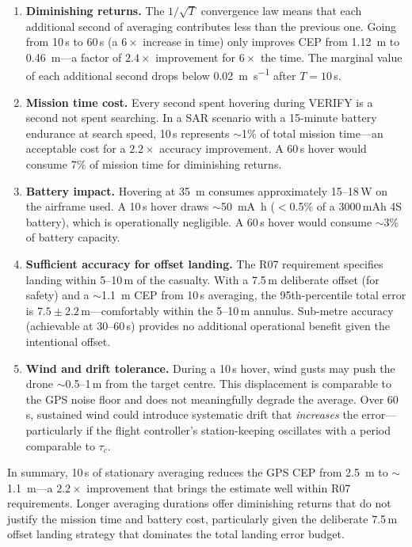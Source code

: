 \begin{enumerate}
  \item \textbf{Diminishing returns.}  The $1/\sqrt{T}$ convergence law means that each additional second of averaging contributes less than the previous one.  Going from 10\,s to 60\,s (a $6\times$ increase in time) only improves CEP from \SI{1.12}{\metre} to \SI{0.46}{\metre}---a factor of $2.4\times$ improvement for $6\times$ the time.  The marginal value of each additional second drops below \SI{0.02}{\metre\per\second} after $T = 10$\,s.

  \item \textbf{Mission time cost.}  Every second spent hovering during VERIFY is a second not spent searching.  In a SAR scenario with a 15-minute battery endurance at search speed, 10\,s represents $\sim$1\% of total mission time---an acceptable cost for a $2.2\times$ accuracy improvement.  A 60\,s hover would consume 7\% of mission time for diminishing returns.

  \item \textbf{Battery impact.}  Hovering at \SI{35}{\metre} consumes approximately 15--18\,W on the airframe used.  A 10\,s hover draws $\sim$\SI{50}{\milli\ampere\hour} ($<$0.5\% of a 3000\,mAh 4S battery), which is operationally negligible.  A 60\,s hover would consume $\sim$3\% of battery capacity.

  \item \textbf{Sufficient accuracy for offset landing.}  The R07 requirement specifies landing within 5--10\,m of the casualty.  With a 7.5\,m deliberate offset (for safety) and a $\sim$\SI{1.1}{\metre} CEP from 10\,s averaging, the 95th-percentile total error is $7.5 \pm 2.2$\,m---comfortably within the 5--10\,m annulus.  Sub-metre accuracy (achievable at 30--60\,s) provides no additional operational benefit given the intentional offset.

  \item \textbf{Wind and drift tolerance.}  During a 10\,s hover, wind gusts may push the drone $\sim$0.5--1\,m from the target centre.  This displacement is comparable to the GPS noise floor and does not meaningfully degrade the average.  Over 60\,s, sustained wind could introduce systematic drift that \emph{increases} the error---particularly if the flight controller's station-keeping oscillates with a period comparable to $\tau_c$.
\end{enumerate}

\noindent In summary, 10\,s of stationary averaging reduces the GPS CEP from \SI{2.5}{\metre} to $\sim$\SI{1.1}{\metre}---a $2.2\times$ improvement that brings the estimate well within R07 requirements.  Longer averaging durations offer diminishing returns that do not justify the mission time and battery cost, particularly given the deliberate 7.5\,m offset landing strategy that dominates the total landing error budget.

